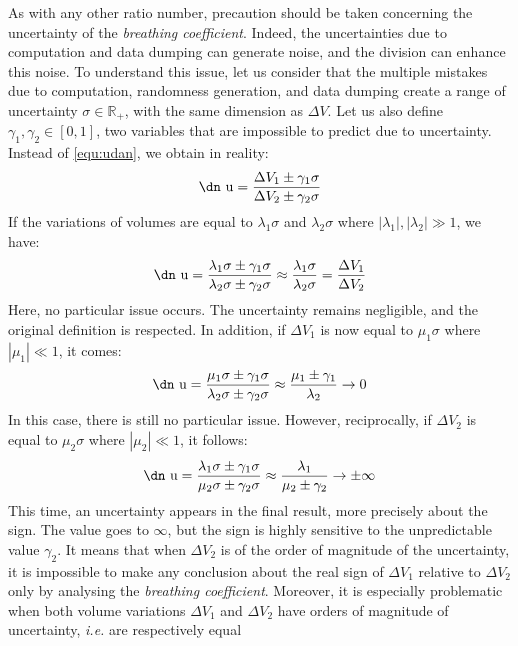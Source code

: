 \documentclass[11pt]{article}
\newcommand{\brco}{\textit{breathing coefficient}\xspace}
\newcommand{\iE}{\textit{i.e.}\xspace}
\newcommand{\DV}[1]{\Delta V_{#1}}
\newcommand{\udan}{\text{\dn u}}
\begin{document}
As with any other ratio number, precaution should be taken concerning the
uncertainty of the \brco. Indeed, the uncertainties due to computation and data
dumping can generate noise, and the division can enhance this noise. To
understand this issue, let us consider that the multiple mistakes due to
computation, randomness generation, and data dumping create a range of
uncertainty $\sigma \in \mathbb{R}_+$, with the same dimension as $\Delta V$.
Let us also define $\gamma_1, \gamma_2 \in [0, 1]$, two variables that are
impossible to predict due to uncertainty. Instead of \cref{equ:udan}, we obtain
in reality:
\begin{equation}
	\udan = \frac{\DV{1} \pm \gamma_1\sigma}{\DV{2} \pm \gamma_2\sigma}
\end{equation}
If the variations of volumes are equal to $\lambda_1 \sigma$ and $\lambda_2
\sigma$ where $|\lambda_1|,|\lambda_2| \gg \text{1}$, we have:
\begin{equation}
	\udan
	= \frac{\lambda_1\sigma \pm \gamma_1\sigma}{\lambda_2\sigma \pm \gamma_2\sigma}
	\approx \frac{\lambda_1\sigma}{\lambda_2\sigma}
	= \frac{\DV{1}}{\DV{2}}
\end{equation}
Here, no particular issue occurs. The uncertainty remains negligible, and the
original definition is respected. In addition, if $\DV{1}$ is now equal to
$\mu_1\sigma$ where $|\mu_1| \ll 1$, it comes:
\begin{equation}
	\udan
	= \frac{\mu_1\sigma \pm \gamma_1\sigma}{\lambda_2\sigma \pm \gamma_2\sigma}
	\approx \frac{\mu_1 \pm \gamma_1}{\lambda_2} \to 0
\end{equation}
In this case, there is still no particular issue. However, reciprocally, if
$\DV{2}$ is equal to $\mu_2\sigma$ where $|\mu_2| \ll 1$, it follows:
\begin{equation}
	\udan
	= \frac{\lambda_1\sigma \pm \gamma_1\sigma}{\mu_2\sigma \pm \gamma_2\sigma}
	\approx \frac{\lambda_1}{\mu_2 \pm \gamma_2} \to \pm\infty
\end{equation}
This time, an uncertainty appears in the final result, more precisely about the
sign. The value goes to $\infty$, but the sign is highly sensitive to the
unpredictable value $\gamma_2$. It means that when $\DV{2}$ is of the order
of magnitude of the uncertainty, it is impossible to make any conclusion about 
the real sign of $\DV{1}$ relative to $\DV{2}$ only by analysing the \brco.
Moreover, it is especially problematic when both volume variations $\DV{1}$ and
$\DV{2}$ have orders of magnitude of uncertainty, \iE are respectively equal
\end{document}

